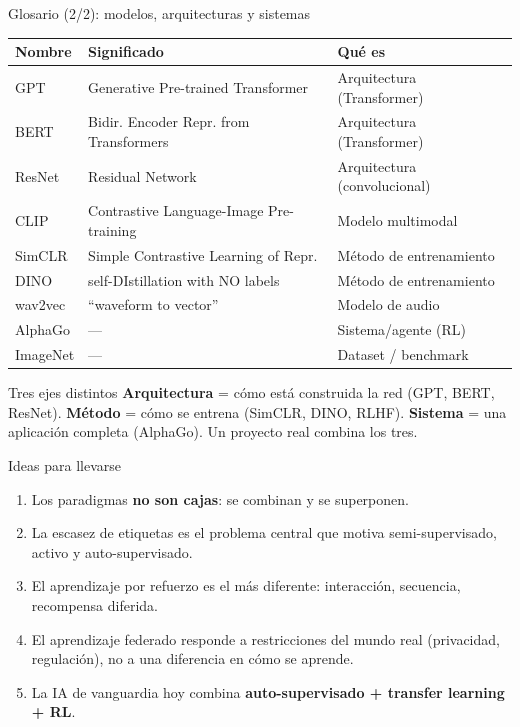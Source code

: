 \documentclass[aspectratio=169]{beamer}
\begin{document}
\begin{frame}{Glosario (2/2): modelos, arquitecturas y sistemas}
  \small
  \begin{table}
    \begin{tabular}{lll}
      \toprule
      \textbf{Nombre} & \textbf{Significado} & \textbf{Qué es} \\
      \midrule
      GPT      & Generative Pre-trained Transformer       & Arquitectura (Transformer) \\
      BERT     & Bidir. Encoder Repr. from Transformers   & Arquitectura (Transformer) \\
      ResNet   & Residual Network                         & Arquitectura (convolucional) \\
      CLIP     & Contrastive Language-Image Pre-training  & Modelo multimodal \\
      SimCLR   & Simple Contrastive Learning of Repr.     & Método de entrenamiento \\
      DINO     & self-DIstillation with NO labels         & Método de entrenamiento \\
      wav2vec  & ``waveform to vector''                   & Modelo de audio \\
      AlphaGo  & ---                                      & Sistema/agente (RL) \\
      ImageNet & ---                                      & Dataset / benchmark \\
      \bottomrule
    \end{tabular}
  \end{table}
  \bigskip
  \begin{alertblock}{Tres ejes distintos}
    \textbf{Arquitectura} = cómo está construida la red (GPT, BERT, ResNet). \textbf{Método} = cómo se entrena (SimCLR, DINO, RLHF). \textbf{Sistema} = una aplicación completa (AlphaGo). Un proyecto real combina los tres.
  \end{alertblock}
\end{frame}



\begin{frame}{Ideas para llevarse}
  \begin{enumerate}
    \item Los paradigmas \textbf{no son cajas}: se combinan y se superponen.
    \item La escasez de etiquetas es el problema central que motiva semi-supervisado, activo y auto-supervisado.
    \item El aprendizaje por refuerzo es el más diferente: interacción, secuencia, recompensa diferida.
    \item El aprendizaje federado responde a restricciones del mundo real (privacidad, regulación), no a una diferencia en cómo se aprende.
    \item La IA de vanguardia hoy combina \textbf{auto-supervisado + transfer learning + RL}.
  \end{enumerate}
\end{frame}
\end{document}
